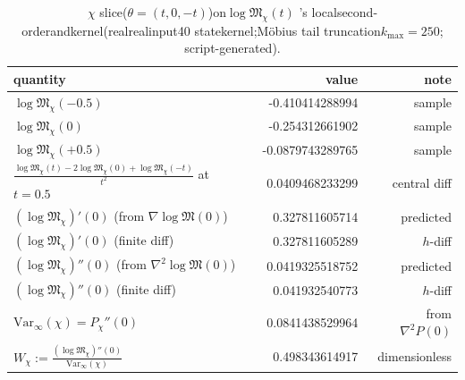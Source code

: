 \begin{table}[H]
\centering
\scriptsize
\setlength{\tabcolsep}{6pt}
\renewcommand{\arraystretch}{1.15}
\caption{$\chi$ slice($\theta=(t,0,-t)$)on$\log\mathfrak{M}_\chi(t)$ 's localsecond-orderandkernel(realrealinput40 statekernel;Möbius tail truncation$k_{\max}=250$; script-generated).}
\label{tab:real-input-40-logM-chi-local-derivatives}
\begin{tabular}{@{}lrr@{}}
\toprule
quantity & value & note \\
\midrule
$\log\mathfrak{M}_\chi(-0.5)$ & -0.410414288994 & sample \\
$\log\mathfrak{M}_\chi(0)$ & -0.254312661902 & sample \\
$\log\mathfrak{M}_\chi(+0.5)$ & -0.0879743289765 & sample \\
\midrule
$\frac{\log\mathfrak{M}_\chi(t)-2\log\mathfrak{M}_\chi(0)+\log\mathfrak{M}_\chi(-t)}{t^2}$ at $t=0.5$ & 0.0409468233299 & central diff \\
\midrule
$(\log\mathfrak{M}_\chi)'(0)$ (from $\nabla\log\mathfrak{M}(0)$) & 0.327811605714 & predicted \\
$(\log\mathfrak{M}_\chi)'(0)$ (finite diff) & 0.327811605289 & $h$-diff \\
$(\log\mathfrak{M}_\chi)''(0)$ (from $\nabla^2\log\mathfrak{M}(0)$) & 0.0419325518752 & predicted \\
$(\log\mathfrak{M}_\chi)''(0)$ (finite diff) & 0.041932540773 & $h$-diff \\
\midrule
$\mathrm{Var}_\infty(\chi)=P_\chi''(0)$ & 0.0841438529964 & from $\nabla^2 P(0)$ \\
$W_\chi:=\frac{(\log\mathfrak{M}_\chi)''(0)}{\mathrm{Var}_\infty(\chi)}$ & 0.498343614917 & dimensionless \\
\bottomrule
\end{tabular}
\end{table}

